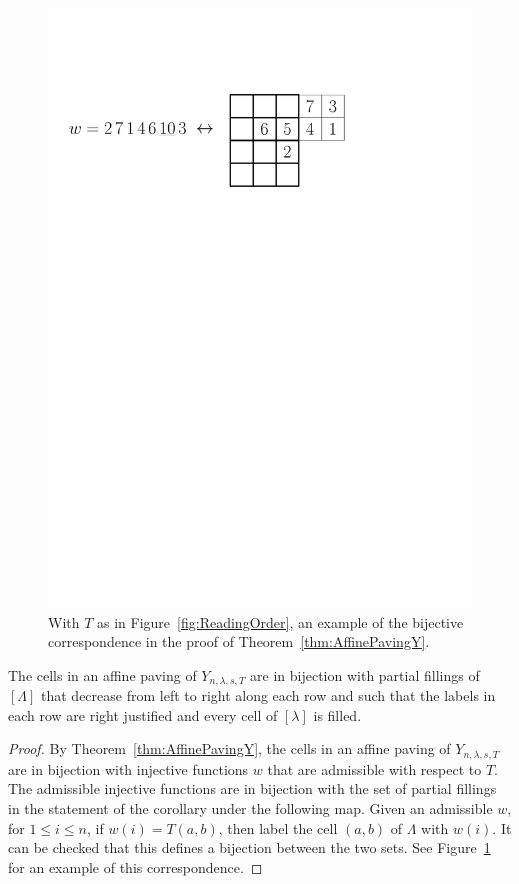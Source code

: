 \documentclass[12pt]{amsart}
\newcommand{\la}{\lambda}
\begin{document}
\begin{figure}[t]
  \centering
  \includegraphics[scale=0.6]{Figures/RowDecreasingBijection.pdf}
  \caption{With $T$ as in Figure~\ref{fig:ReadingOrder}, an example of the bijective correspondence in the proof of Theorem~\ref{thm:AffinePavingY}.\label{fig:FillingBijectionExample}}
\end{figure}

\begin{corollary}\label{cor:AffinePavingFillings}
The cells in an affine paving of $Y_{n,\la,s,T}$ are in bijection with partial fillings of $[\Lambda]$ that decrease from left to right along each row and such that the labels in each row are right justified and every cell of $[\lambda]$ is filled.
\end{corollary}

\begin{proof}
By Theorem~\ref{thm:AffinePavingY}, the cells in an affine paving of $Y_{n,\la,s,T}$ are in bijection with injective functions $w$ that are admissible with respect to $T$. The admissible injective functions are in bijection with the set of partial fillings in the statement of the corollary under the following map. Given an admissible $w$, for $1\leq i\leq n$, if $w(i) = T(a,b)$, then label the cell $(a,b)$ of $\Lambda$ with $w(i)$. It can be checked that this defines a bijection between the two sets. See Figure~\ref{fig:FillingBijectionExample} for an example of this correspondence.
\end{proof}
\end{document}
